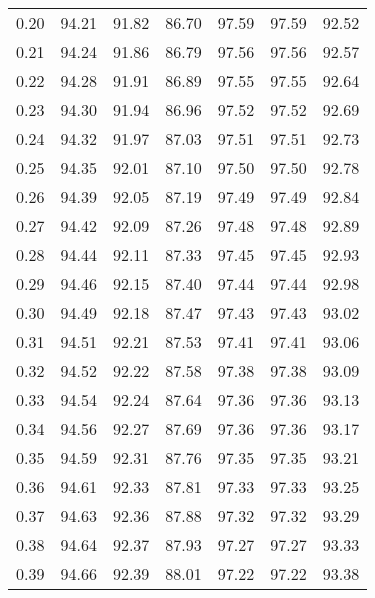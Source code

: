\begin{tabular}{|c|c|c|c|c|c|c|}
      0.20 &     94.21 &     91.82 &      86.70 &   97.59 &      97.59 &         92.52 \\
      0.21 &     94.24 &     91.86 &      86.79 &   97.56 &      97.56 &         92.57 \\
      0.22 &     94.28 &     91.91 &      86.89 &   97.55 &      97.55 &         92.64 \\
      0.23 &     94.30 &     91.94 &      86.96 &   97.52 &      97.52 &         92.69 \\
      0.24 &     94.32 &     91.97 &      87.03 &   97.51 &      97.51 &         92.73 \\
      0.25 &     94.35 &     92.01 &      87.10 &   97.50 &      97.50 &         92.78 \\
      0.26 &     94.39 &     92.05 &      87.19 &   97.49 &      97.49 &         92.84 \\
      0.27 &     94.42 &     92.09 &      87.26 &   97.48 &      97.48 &         92.89 \\
      0.28 &     94.44 &     92.11 &      87.33 &   97.45 &      97.45 &         92.93 \\
      0.29 &     94.46 &     92.15 &      87.40 &   97.44 &      97.44 &         92.98 \\
      0.30 &     94.49 &     92.18 &      87.47 &   97.43 &      97.43 &         93.02 \\
      0.31 &     94.51 &     92.21 &      87.53 &   97.41 &      97.41 &         93.06 \\
      0.32 &     94.52 &     92.22 &      87.58 &   97.38 &      97.38 &         93.09 \\
      0.33 &     94.54 &     92.24 &      87.64 &   97.36 &      97.36 &         93.13 \\
      0.34 &     94.56 &     92.27 &      87.69 &   97.36 &      97.36 &         93.17 \\
      0.35 &     94.59 &     92.31 &      87.76 &   97.35 &      97.35 &         93.21 \\
      0.36 &     94.61 &     92.33 &      87.81 &   97.33 &      97.33 &         93.25 \\
      0.37 &     94.63 &     92.36 &      87.88 &   97.32 &      97.32 &         93.29 \\
      0.38 &     94.64 &     92.37 &      87.93 &   97.27 &      97.27 &         93.33 \\
      0.39 &     94.66 &     92.39 &      88.01 &   97.22 &      97.22 &         93.38 \\

\end{tabular}
